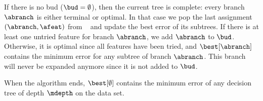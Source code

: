 \documentclass{llncs}
\begin{document}
If there is no bud ($\bud = \emptyset$), then the current tree is complete: every branch $\abranch$ is either terminal or optimal. In that case we pop the last assignment $(\abranch,\afeat)$ from \sequence\ 
and update the best error of its subtrees. If there is at least one untried feature for branch $\abranch$, we add $\abranch$ to $\bud$.
Otherwise, it is optimal since all features have been tried, and $\best[\abranch]$ contains the minimum error for any subtree of branch $\abranch$. 
This branch will never be expanded anymore since it is not added to $\bud$.

When the algorithm ends, $\best[\emptyset]$ contains the minimum error of any decision tree of depth $\mdepth$ on the data set.


%
%
%
\end{document}
